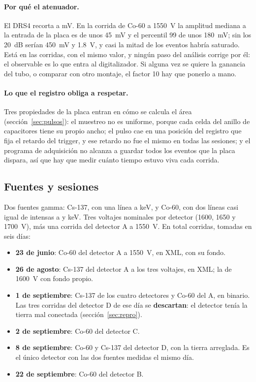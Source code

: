\documentclass[11pt,a4paper]{article}
\begin{document}
\paragraph{Por qué el atenuador.} El DRS4 recorta a \VSatura{} mV. En la
corrida de Co-60 a 1550~V la amplitud mediana a la entrada de la placa es de
unos 45~mV y el percentil 99 de unos 180~mV; sin los 20~dB serían 450~mV y
1.8~V, y casi la mitad de los eventos habría saturado. Está en las
\NCorridas{} corridas, con el mismo valor, y ningún paso del análisis corrige
por él: el observable es lo que entra al digitalizador. Si alguna vez se
quiere la ganancia del tubo, o comparar con otro montaje, el factor 10 hay que
ponerlo a mano.

\paragraph{Lo que el registro obliga a respetar.} Tres propiedades de la placa
entran en cómo se calcula el área (sección~\ref{sec:pulsos}): el muestreo no
es uniforme, porque cada celda del anillo de capacitores tiene su propio
ancho; el pulso cae en una posición del registro que fija el retardo del
trigger, y ese retardo no fue el mismo en todas las sesiones; y el programa
de adquisición no alcanza a guardar todos los eventos que la placa dispara,
así que hay que medir cuánto tiempo estuvo viva cada corrida.

\subsection{Fuentes y sesiones}

Dos fuentes gamma: Cs-137, con una línea a \EgammaCs{} keV, y Co-60, con dos
líneas casi igual de intensas a \EgammaCoA{} y \EgammaCoB{} keV. Tres
voltajes nominales por detector (1600, 1650 y 1700~V), más una corrida del
detector A a 1550~V. En total \NCorridas{} corridas, tomadas en seis días:

\begin{itemize}
\item \textbf{23 de junio}: Co-60 del detector A a 1550~V, en XML, con su
      fondo.
\item \textbf{26 de agosto}: Cs-137 del detector A a los tres voltajes, en
      XML; la de 1600~V con fondo propio.
\item \textbf{1 de septiembre}: Cs-137 de los cuatro detectores y Co-60 del
      A, en binario. Las tres corridas del detector D de ese día se
      \textbf{descartan}: el detector tenía la tierra mal conectada
      (sección~\ref{sec:repro}).
\item \textbf{2 de septiembre}: Co-60 del detector C.
\item \textbf{8 de septiembre}: Co-60 y Cs-137 del detector D, con la tierra
      arreglada. Es el único detector con las dos fuentes medidas el mismo
      día.
\item \textbf{22 de septiembre}: Co-60 del detector B.
\end{itemize}
\end{document}
